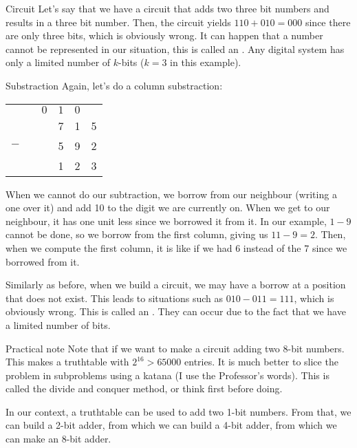 \documentclass[a4paper]{article}
\begin{document}
\begin{parag}{Circuit}
    Let's say that we have a circuit that adds two three bit numbers and results in a three bit number. Then, the circuit yields $110 + 010 = 000$ since there are only three bits, which is obviously wrong. It can happen that a number cannot be represented in our situation, this is called an . Any digital system has only a limited number of $k$-bits ($k=3$ in this example).
\end{parag}

\begin{parag}{Substraction}
    Again, let's do a column substraction:
    \begin{center}
    \begin{tabular}{r@{\,}r@{\,}r@{\,}r@{\,}r@{\,}r@{\,}}
        & & \tiny$0$ & \tiny$1$ & \tiny$0$ & \\
        & & & 7 & 1 & 5  \\
        $-$ & & & 5 & 9 & 2  \\
        \hline
        & & & 1 & 2 & 3
    \end{tabular}
    \end{center}

    When we cannot do our subtraction, we borrow from our neighbour (writing a one over it) and add 10 to the digit we are currently on. When we get to our neighbour, it has one unit less since we borrowed it from it. In our example, $1 - 9$ cannot be done, so we borrow from the first column, giving us $11 - 9 = 2$. Then, when we compute the first column, it is like if we had 6 instead of the 7 since we borrowed from it.

    Similarly as before, when we build a circuit, we may have a borrow at a position that does not exist. This leads to situations such as $010 - 011 = 111$, which is obviously wrong. This is called an . They can occur due to the fact that we have a limited number of bits.
\end{parag}

\begin{parag}{Practical note}
    Note that if we want to make a circuit adding two 8-bit numbers. This makes a truthtable with $2^{16} > 65000$ entries. It is much better to slice the problem in subproblems using a katana (I use the Professor's words). This is called the divide and conquer method, or think first before doing.

    In our context, a truthtable can be used to add two 1-bit numbers. From that, we can build a 2-bit adder, from which we can build a 4-bit adder, from which we can make an 8-bit adder.
\end{parag}
\end{document}
